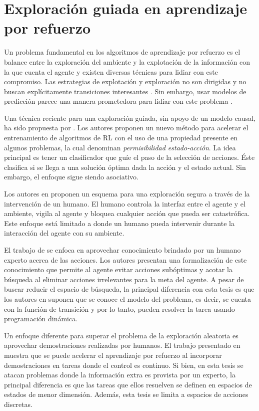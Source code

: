 \section{Exploración guiada en aprendizaje por refuerzo}

Un problema fundamental en los algoritmos de aprendizaje por refuerzo
es el balance entre la exploración del ambiente y la explotación
de la información con la que cuenta el agente y existen diversas técnicas para lidiar con este compromiso.
Las estrategias de explotación y exploración no 
son dirigidas y no buscan explícitamente transiciones
interesantes \cite{mcfarlane2018survey}.
Sin embargo, usar modelos de predicción parece una manera 
prometedora para lidiar con este problema \cite{hafner2019dream}.

 
Una técnica reciente para una exploración 
guiada, sin apoyo de un modelo causal, ha sido
propuesta por \cite{mazumder2019guided}.
Los autores proponen un nuevo método
para acelerar el entrenamiento de algoritmos de RL con el uso de una propiedad presente
en algunos problemas, la cual denominan \textit{permisibilidad estado-acción}.
La idea principal es tener un clasificador
que guíe el paso de la selección de acciones. Éste clasifica si se llega
a una solución óptima dada la acción y el
estado actual. Sin embargo, el enfoque sigue siendo
asociativo.

Los autores en \cite{saunders2017trial} proponen un esquema 
para una exploración segura a través de la intervención de un humano. El humano controla la interfaz entre el agente y el ambiente, vigila
al agente y bloquea cualquier acción que pueda ser catastrófica. Este enfoque
está limitado a donde un humano pueda intervenir durante la interacción 
del agente con su ambiente.


El trabajo de \cite{Abel2015GoalBasedAP}  se enfoca en aprovechar conocimiento
brindado por un humano experto acerca de las acciones. Los autores presentan
una formalización de este conocimiento que permite al agente 
evitar acciones subóptimas y acotar la búsqueda al eliminar acciones 
irrelevantes para la meta del agente. A pesar de buscar reducir el espacio 
de búsqueda, la principal diferencia con esta tesis es que
los autores en \cite{Abel2015GoalBasedAP} suponen que se conoce el modelo 
del problema, es decir, se cuenta con la función de transición y por lo tanto,
pueden resolver la tarea usando programación dinámica.


Un enfoque diferente para superar el problema de la exploración aleatoria es
aprovechar demostraciones realizadas por humanos. El trabajo presentado en \cite{nair2017overcoming} muestra que se puede acelerar el aprendizaje por refuerzo al incorporar demostraciones en tareas donde el control es continuo. Si bien, en esta tesis se atacan problemas donde la información extra es provista por un experto, la principal diferencia es que las tareas que ellos resuelven se definen en espacios de estados de menor dimensión. Además, esta tesis se limita a espacios de acciones discretas.


